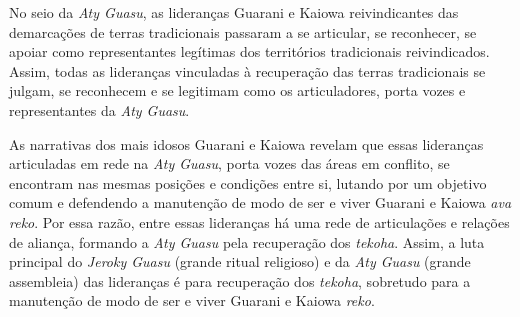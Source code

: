No seio da \emph{Aty Guasu}, as lideranças Guarani e Kaiowa reivindicantes das
demarcações de terras tradicionais passaram a se articular, se
reconhecer, se apoiar como representantes legítimas dos territórios
tradicionais reivindicados. Assim, todas as lideranças vinculadas à
recuperação das terras tradicionais se julgam, se reconhecem e se
legitimam como os articuladores, porta vozes e representantes da \emph{Aty
Guasu}. 

As narrativas dos mais idosos Guarani e Kaiowa revelam que essas
lideranças articuladas em rede na \emph{Aty Guasu}, porta vozes das áreas em
conflito, se encontram nas mesmas posições e condições entre si,
lutando por um objetivo comum e defendendo a manutenção de modo de ser
e viver Guarani e Kaiowa \emph{ava reko}. Por essa razão, entre essas
lideranças há uma rede de articulações e relações de aliança, formando
a \emph{Aty Guasu} pela recuperação dos \emph{tekoha}. Assim, a luta principal do
\emph{Jeroky Guasu} (grande ritual religioso) e da \emph{Aty Guasu} (grande
assembleia) das lideranças é para recuperação dos \emph{tekoha}, sobretudo
para a manutenção de modo de ser e viver Guarani e Kaiowa \emph{reko}.

\pagebreak

